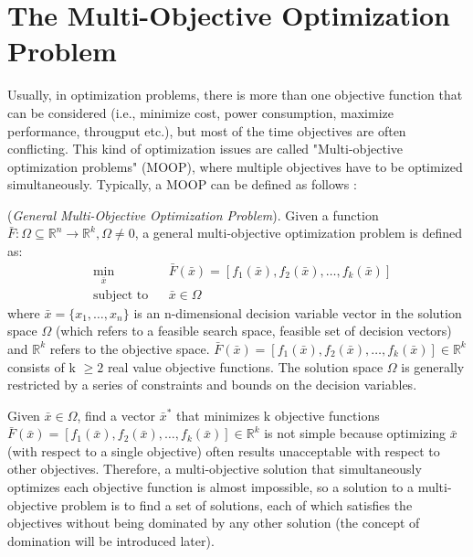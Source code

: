 \section{The Multi-Objective Optimization Problem}
Usually, in optimization problems, there is more than one objective function that can be considered (i.e., minimize cost, power consumption, maximize performance, througput etc.), but most of the time objectives are often conflicting. This kind of optimization issues are called "Multi-objective optimization problems" (MOOP), where multiple objectives have to be optimized simultaneously. Typically, a MOOP can be defined as follows \cite{bib3}:
%
\theoremstyle{definition}
\begin{definition}{(\textit{General Multi-Objective Optimization Problem}).}
Given a function $ \bar F : \Omega \subseteq \mathbb{R}^{n} \to \mathbb{R}^k, \Omega \not= 0$, a general multi-objective optimization problem is defined as:
%
\begin{equation}\label{equation113}
  \begin{aligned}
    & \underset{\bar x}{\text{min}} &  & \bar F(\bar x) = [f_1(\bar x), f_2(\bar x), \ldots , f_k(\bar x)] \\
    & \text{subject to}             &  & \bar x \in \Omega
\end{aligned}
\end{equation}
%
where $\bar x = \{x_1,\ldots, x_n\}$ is an n-dimensional decision variable vector in the solution space $\Omega$ (which refers to a feasible search space, feasible set of decision vectors) and $\mathbb{R}^k$ refers to the objective space. $\bar F(\bar x) = [f_1(\bar x), f_2(\bar x), \ldots , f_k(\bar x)] \in \mathbb{R}^k$ consists of k $\geq 2$ real value objective functions. The solution space $\Omega$ is generally restricted by a series of constraints and bounds on the decision variables.
%
\end{definition}
%
Given $\bar x \in \Omega$, find a vector $\bar x^\ast$ that minimizes k objective functions $\bar F(\bar x) = [f_1(\bar x), f_2(\bar x), \ldots , f_k(\bar x)] \in \mathbb{R}^k$ is not simple because optimizing $\bar x$ (with respect to a single objective) often results unacceptable with respect to other objectives. Therefore, a multi-objective solution that simultaneously optimizes each objective function is almost impossible, so a solution to a multi-objective problem is to find a set of solutions, each of which satisfies the objectives without being dominated by any other solution (the concept of domination will be introduced later). \par
